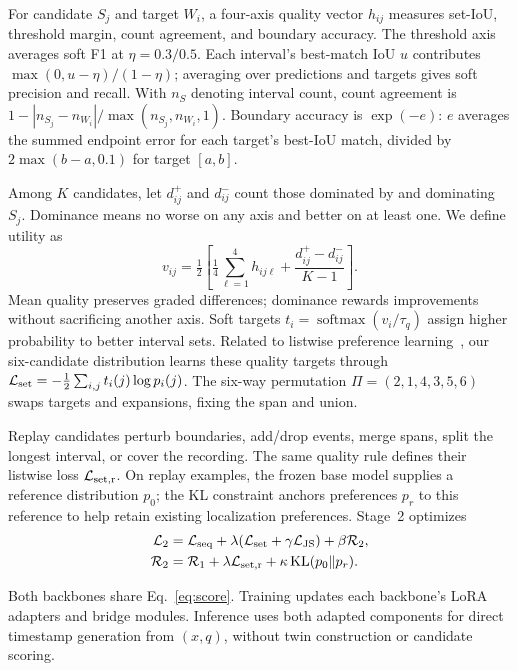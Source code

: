 For candidate $S_j$ and target $W_i$, a four-axis quality vector $h_{ij}$ measures set-IoU, threshold margin, count agreement, and boundary accuracy. The threshold axis averages soft F1 at $\eta=0.3/0.5$. Each interval's best-match IoU $u$ contributes $\max(0,u-\eta)/(1-\eta)$; averaging over predictions and targets gives soft precision and recall. With $n_S$ denoting interval count, count agreement is $1-|n_{S_j}-n_{W_i}|/\max(n_{S_j},n_{W_i},1)$. Boundary accuracy is $\exp(-e)$: $e$ averages the summed endpoint error for each target's best-IoU match, divided by $2\max(b-a,0.1)$ for target $[a,b]$.

Among $K$ candidates, let $d^+_{ij}$ and $d^-_{ij}$ count those dominated by and dominating $S_j$. Dominance means no worse on any axis and better on at least one. We define utility as
\begin{equation}
v_{ij}=\tfrac12\left[\tfrac14\sum_{\ell=1}^{4}h_{ij\ell}
+\frac{d^+_{ij}-d^-_{ij}}{K-1}\right].
\label{eq:quality}
\end{equation}
Mean quality preserves graded differences; dominance rewards improvements without sacrificing another axis. Soft targets $t_i=\operatorname{softmax}(v_i/\tau_q)$ assign higher probability to better interval sets. Related to listwise preference learning~\cite{liu2025lipo}, our six-candidate distribution learns these quality targets through $\mathcal L_{\rm set}=-\tfrac12\sum_{i,j}t_i(j)\log p_i(j)$. The six-way permutation $\Pi=(2,1,4,3,5,6)$ swaps targets and expansions, fixing the span and union.

Replay candidates perturb boundaries, add/drop events, merge spans, split the longest interval, or cover the recording. The same quality rule defines their listwise loss $\mathcal L_{\rm set,r}$. On replay examples, the frozen base model supplies a reference distribution $p_0$; the KL constraint anchors preferences $p_r$ to this reference to help retain existing localization preferences. Stage~2 optimizes
\begin{equation}
\begin{aligned}
\mathcal L_2&=\mathcal L_{\rm seq}+\lambda(\mathcal L_{\rm set}
+\gamma\mathcal L_{\rm JS})+\beta\mathcal R_2,\\
\mathcal R_2&=\mathcal R_1+\lambda\mathcal L_{\rm set,r}
+\kappa\operatorname{KL}(p_0\Vert p_r).
\end{aligned}
\label{eq:stage2}
\end{equation}

Both backbones share Eq.~\ref{eq:score}. Training updates each backbone's LoRA adapters and bridge modules. Inference uses both adapted components for direct timestamp generation from $(x,q)$, without twin construction or candidate scoring.
